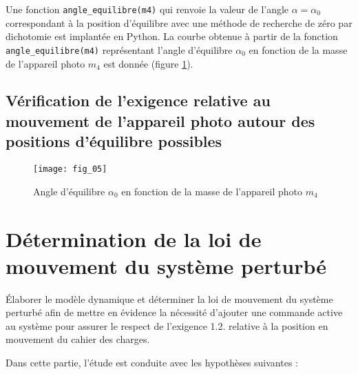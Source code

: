 Une fonction \texttt{angle\_equilibre(m4)} qui renvoie la valeur de l'angle $\alpha=\alpha_{0}$ correspondant à la position d'équilibre avec une méthode de recherche de zéro par dichotomie est implantée en Python. La courbe obtenue à partir de la fonction \texttt{angle\_equilibre(m4)} représentant l'angle d'équilibre $\alpha_{0}$ en fonction de la masse de l'appareil photo $m_{4}$ est donnée (figure \ref{fig:05}).

\ifprof
\begin{corrige}
\end{corrige}
\else
\fi

\subsection{Vérification de l'exigence relative au mouvement de l'appareil photo autour des positions d'équilibre possibles}
\ifprof
\begin{corrige}
\end{corrige}
\else
\fi

\begin{figure}[H]
\centering
\texttt{[image: fig\_05]}
\caption{\label{fig:05} Angle d'équilibre $\alpha_{0}$ en fonction de la masse de l'appareil photo $m_{4}$}
\end{figure}



\section{\label{part:3}Détermination de la loi de mouvement du système perturbé }
\begin{obj}
Élaborer le modèle dynamique et déterminer la loi de mouvement du système perturbé afin de mettre en évidence la nécessité d'ajouter une commande active au système pour assurer le respect de l'exigence 1.2. relative à la position en mouvement du cahier des charges.
\end{obj}

Dans cette partie, l'étude est conduite avec les hypothèses suivantes :

